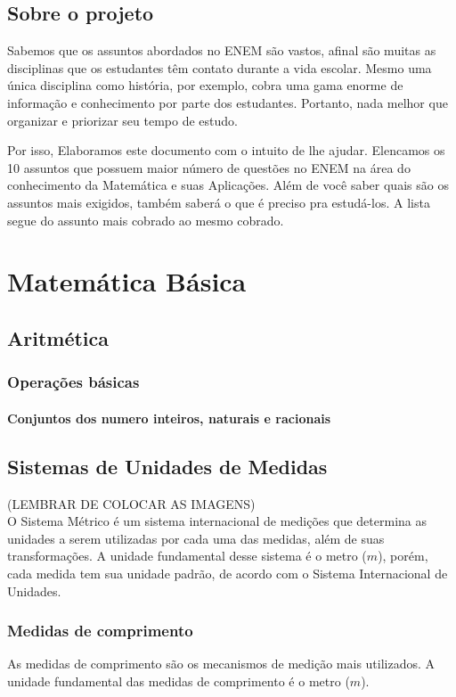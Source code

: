\documentclass[11pt,fleqn]{book}
\begin{document}
\pagestyle{fancy} %


\chapter{Sobre o projeto}
Sabemos que os assuntos abordados no ENEM são vastos, afinal são muitas as disciplinas que os estudantes têm contato durante a vida escolar. Mesmo uma única disciplina como história, por exemplo, cobra uma gama enorme de informação e conhecimento por parte dos estudantes. Portanto, nada melhor que organizar e priorizar seu tempo de estudo.

Por isso, Elaboramos este documento com o intuito de lhe ajudar. Elencamos os 10 assuntos que possuem maior número de questões no ENEM na área do conhecimento da Matemática e suas Aplicações. Além de você saber quais são os assuntos mais exigidos, também saberá o que é preciso pra estudá-los. A lista segue do assunto mais cobrado ao mesmo cobrado.


\part{Matemática Básica}


\chapter{Aritmética}
\section{Operações básicas }
	\subsection{Conjuntos dos numero inteiros, naturais e racionais}


\chapter{Sistemas de Unidades de Medidas}
(LEMBRAR DE COLOCAR AS IMAGENS)
\\O Sistema Métrico é um sistema internacional de medições que determina as unidades a serem utilizadas por cada uma das medidas, além de suas transformações. A unidade fundamental desse sistema é o metro ($m$), porém, cada medida tem sua unidade padrão, de acordo com o Sistema Internacional de Unidades. 

\section{Medidas de comprimento}
As medidas de comprimento são os mecanismos de medição mais utilizados. A unidade fundamental das medidas de comprimento é o metro ($m$). 
\end{document}
